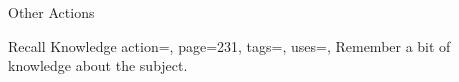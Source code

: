 \begin{PageBack}
\begin{Tables}{\backTableHeight}
\begin{Table}{Other Actions}
            \begin{entry}{Recall Knowledge}{%
                action=,
                page=231,
                tags=\Concentrate,
                uses={\VariousKnowledge[tags={S}]},
            }
                Remember a bit of knowledge about the subject.\hfill
                \quad
            \end{entry}
        \end{Table}
    \end{Tables}%
\end{PageBack}




